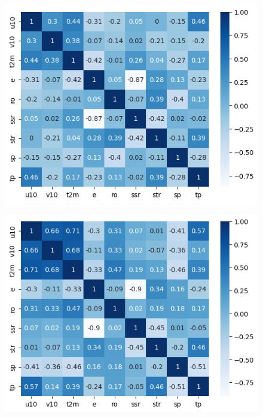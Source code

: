 \begin{figure}[H]
    \centering
    \includegraphics[width=\textwidth]{images/svr_corr_matrix.png}
    \caption{}
    \label{svr-corr-matrix}
\end{figure}

\begin{figure}[H]
    \centering
    \includegraphics[width=\textwidth]{images/dt_corr_matrix.png}
    \caption{}
    \label{dt-corr-matrix}
\end{figure}



